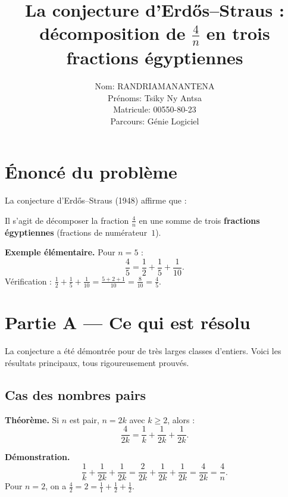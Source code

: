 \documentclass[12pt,a4paper]{article}
\title{La conjecture d'Erdős--Straus :\\ décomposition de $\frac{4}{n}$ en trois fractions égyptiennes}
\author{Nom: RANDRIAMANANTENA \\
Prénoms: Tsiky Ny Antsa \\
Matricule: 00550-80-23 \\
Parcours: Génie Logiciel}
\date{}
\begin{document}
\maketitle

\section*{Énoncé du problème}

La conjecture d'Erdős--Straus (1948) affirme que :

\begin{center}
\end{center}

Il s'agit de décomposer la fraction $\frac{4}{n}$ en une somme de trois \textbf{fractions égyptiennes} (fractions de numérateur~$1$).

\medskip
\textbf{Exemple élémentaire.}
Pour $n = 5$ :
\[
\frac{4}{5} = \frac{1}{2} + \frac{1}{5} + \frac{1}{10}.
\]
Vérification : $\displaystyle \frac{1}{2} + \frac{1}{5} + \frac{1}{10} = \frac{5 + 2 + 1}{10} = \frac{8}{10} = \frac{4}{5}$.

\section{Partie A --- Ce qui est résolu}

La conjecture a été démontrée pour de très larges classes d'entiers. Voici les résultats principaux, tous rigoureusement prouvés.

\subsection{Cas des nombres pairs}

\textbf{Théorème.} Si $n$ est pair, $n = 2k$ avec $k \ge 2$, alors :
\[
\frac{4}{2k} = \frac{1}{k} + \frac{1}{2k} + \frac{1}{2k}.
\]

\textbf{Démonstration.}
\[
\frac{1}{k} + \frac{1}{2k} + \frac{1}{2k}
= \frac{2}{2k} + \frac{1}{2k} + \frac{1}{2k}
= \frac{4}{2k}
= \frac{4}{n}.
\]
Pour $n = 2$, on a $\frac{4}{2} = 2 = \frac{1}{1} + \frac{1}{2} + \frac{1}{2}$.
\end{document}
